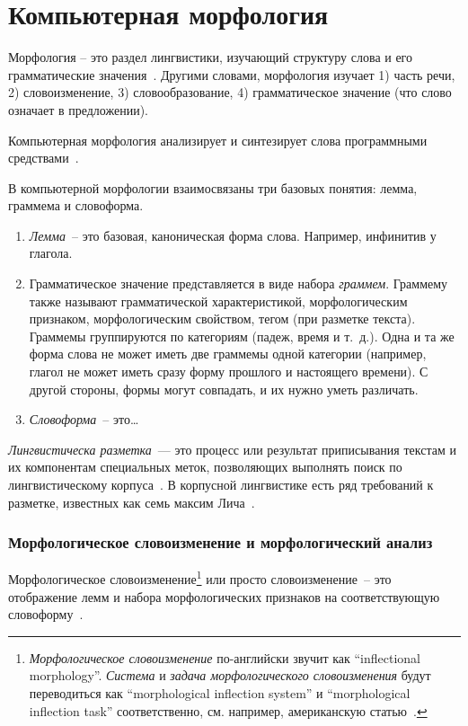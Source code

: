 \section{Компьютерная морфология}\label{sect_review_comp_morphology}

Морфология -- это раздел лингвистики, изучающий структуру слова и его грамматические значения~\cite{MitreninaNikolaevLando2016}. Другими словами, морфология изучает
1) часть речи,
2) словоизменение,
3) словообразование,
4) грамматическое значение (что слово означает в предложении). 

Компьютерная морфология анализирует и синтезирует слова программными средствами~\cite{MitreninaNikolaevLando2016}. 

В компьютерной морфологии взаимосвязаны три базовых понятия: лемма, граммема и словоформа.
\begin{enumerate}
    \item \emph{Лемма}~-- это базовая, каноническая форма слова. 
        Например, инфинитив у глагола.

    \item Грамматическое значение представляется в виде набора \emph{граммем}. 
        Граммему также называют грамматической характеристикой, 
          морфологическим признаком, морфологическим свойством, 
          тегом (при разметке текста). 
        Граммемы группируются по категориям (падеж, время и т.~д.). 
        Одна и та же форма слова не может иметь две граммемы одной категории 
        (например, глагол не может иметь сразу форму прошлого и настоящего времени). 
        С другой стороны, формы могут совпадать, и их нужно уметь различать. 

    \item \emph{Словоформа}~-- это\ldots {}
\end{enumerate}

\emph{Лингвистическа разметка}~--- это процесс или результат 
приписывания текстам и их компонентам специальных меток, 
позволяющих выполнять поиск по лингвистическому корпуса~\cite[415]{Kibrik2019}.
%
В корпусной лингвистике есть ряд требований к разметке, известных как 
семь максим Лича~\cite[415--416]{Kibrik2019}. 



\subsubsection{Морфологическое словоизменение и морфологический анализ}

Морфологическое словоизменение\footnote{%
    \emph{Морфологическое словоизменение} по-английски звучит как
    ``inflectional morphology''. 
    \emph{Система} и \emph{задача морфологического словоизменения} 
    будут переводиться как 
    ``morphological inflection system'' и ``morphological inflection task'' соответственно, 
    см. например, американскую статью~\cite{King2020seq2seqRussianMA}.
} или просто словоизменение~--
это отображение лемм и набора морфологических признаков 
на соответствующую словоформу~\cite[2821]{Cruz-Anastasopoulos-Stump2020Chatino}.

